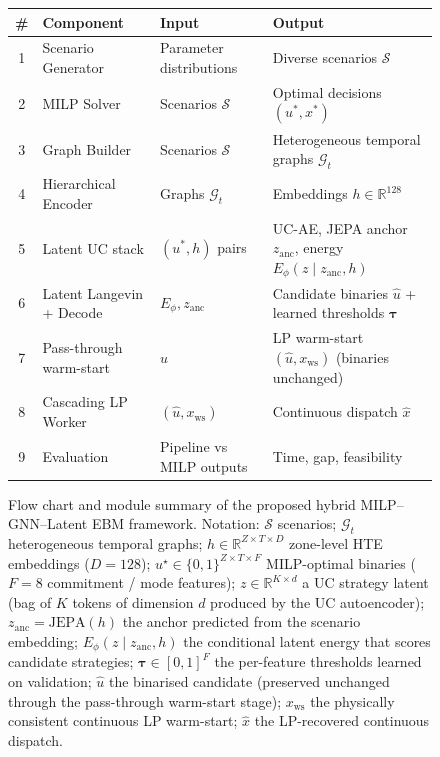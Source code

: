 \documentclass{article}
\begin{document}
\begin{figure}[p]
{\begin{tikzpicture}
\end{tikzpicture}
}

\vspace{0.6em}
\centering
\small
\begin{tabular}{clll}
\toprule
\textbf{\#} & \textbf{Component} & \textbf{Input} & \textbf{Output} \\
\midrule
1 & Scenario Generator & Parameter distributions & Diverse scenarios $\mathcal{S}$ \\
2 & MILP Solver & Scenarios $\mathcal{S}$ & Optimal decisions $(u^*, x^*)$ \\
3 & Graph Builder & Scenarios $\mathcal{S}$ & Heterogeneous temporal graphs $\mathcal{G}_t$ \\
4 & Hierarchical Encoder & Graphs $\mathcal{G}_t$ & Embeddings $h \in \mathbb{R}^{128}$ \\
5 & Latent UC stack & $(u^*, h)$ pairs & UC-AE, JEPA anchor $z_{\mathrm{anc}}$, energy $E_\phi(z \mid z_{\mathrm{anc}}, h)$ \\
6 & Latent Langevin + Decode & $E_\phi, z_{\mathrm{anc}}$ & Candidate binaries $\hat{u}$ + learned thresholds $\boldsymbol{\tau}$ \\
7 & Pass-through warm-start & $\hat{u}$ & LP warm-start $(\hat{u}, x_{\mathrm{ws}})$ (binaries unchanged) \\
8 & Cascading LP Worker & $(\hat{u}, x_{\mathrm{ws}})$ & Continuous dispatch $\hat{x}$ \\
9 & Evaluation & Pipeline vs MILP outputs & Time, gap, feasibility \\
\bottomrule
\end{tabular}


\caption{Flow chart and module summary of the proposed hybrid MILP--GNN--Latent EBM framework. Notation: $\mathcal{S}$ scenarios; $\mathcal{G}_t$ heterogeneous temporal graphs; $h \in \mathbb{R}^{Z \times T \times D}$ zone-level HTE embeddings ($D{=}128$); $u^\star \in \{0,1\}^{Z \times T \times F}$ MILP-optimal binaries ($F{=}8$ commitment / mode features); $z \in \mathbb{R}^{K \times d}$ a UC strategy latent (bag of $K$ tokens of dimension $d$ produced by the UC autoencoder); $z_{\mathrm{anc}} = \mathrm{JEPA}(h)$ the anchor predicted from the scenario embedding; $E_\phi(z \mid z_{\mathrm{anc}}, h)$ the conditional latent energy that scores candidate strategies; $\boldsymbol{\tau} \in [0,1]^F$ the per-feature thresholds learned on validation; $\hat u$ the binarised candidate (preserved unchanged through the pass-through warm-start stage); $x_{\mathrm{ws}}$ the physically consistent continuous LP warm-start; $\hat x$ the LP-recovered continuous dispatch.}
\label{fig:milp-gnn-ebm-pipeline}
\end{figure}
\end{document}
